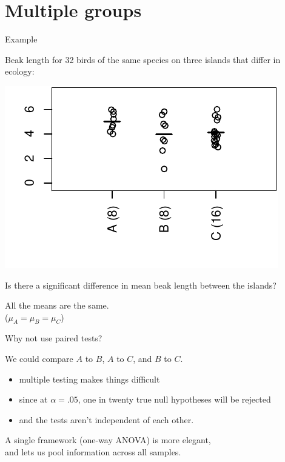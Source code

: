 \section{Multiple groups}

\begin{frame}{Example}

  Beak length for 32 birds of the same species on three islands that differ in ecology:
\begin{center}
  \includegraphics{dots2ex.pdf}
\end{center}

    \vspace{2em}

     Is there a significant difference in mean beak length between the islands?

    \vspace{2em}

     All the means are the same.\\
    ($\mu_A = \mu_B = \mu_C$)

\end{frame}

\begin{frame}{Why not use paired tests?}

  We could compare $A$ to $B$, $A$ to $C$, and $B$ to $C$.\\
  \begin{itemize}
    \item \alert{multiple testing} makes things difficult
    \item since at $\alpha=.05$, one in twenty true null hypotheses will be rejected
    \item and the tests aren't independent of each other.
  \end{itemize}

    \vspace{2em}

    A single framework (\alert{one-way ANOVA}) is more elegant,\\
    and lets us \alert{pool information} across all samples.

\end{frame}

